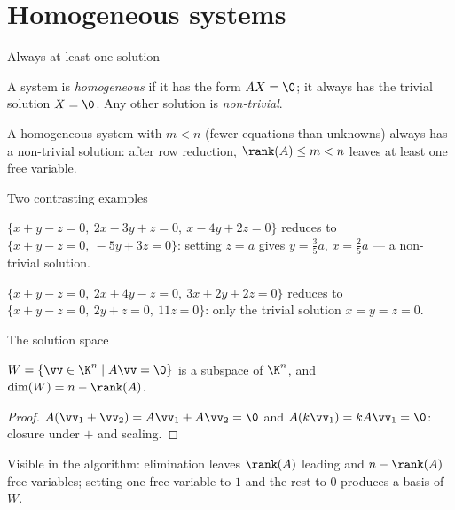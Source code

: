 \section{Homogeneous systems}

\begin{frame}{Always at least one solution}
\begin{definition}
A system is \emph{homogeneous} if it has the form $AX=\0$; it always has the trivial solution $X=\0$. Any
other solution is \emph{non-trivial}.
\end{definition}

\pause

\begin{fact}
A homogeneous system with $m<n$ (fewer equations than unknowns) always has a non-trivial solution: after
row reduction, $\rank(A)\leq m<n$ leaves at least one free variable.
\end{fact}
\end{frame}

\begin{frame}{Two contrasting examples}
\begin{example}
$\{x+y-z=0,\ 2x-3y+z=0,\ x-4y+2z=0\}$ reduces to $\{x+y-z=0,\ -5y+3z=0\}$: setting $z=a$ gives
$y=\tfrac35 a$, $x=\tfrac25 a$ — a non-trivial solution.
\end{example}

\pause

\begin{example}
$\{x+y-z=0,\ 2x+4y-z=0,\ 3x+2y+2z=0\}$ reduces to $\{x+y-z=0,\ 2y+z=0,\ 11z=0\}$: only the trivial solution
$x=y=z=0$.
\end{example}
\end{frame}

\begin{frame}{The solution space}
\begin{theorem}
$W=\{\vv\in\K^n\mid A\vv=\0\}$ is a subspace of $\K^n$, and $\dim(W)=n-\rank(A)$.
\end{theorem}

\pause

\begin{proof}
$A(\vv_1+\vv_2)=A\vv_1+A\vv_2=\0$ and $A(k\vv_1)=kA\vv_1=\0$: closure under $+$ and scaling.
\end{proof}

\pause

\begin{remark}
Visible in the algorithm: elimination leaves $\rank(A)$ leading and $n-\rank(A)$ free variables; setting one
free variable to $1$ and the rest to $0$ produces a basis of $W$.
\end{remark}
\end{frame}


